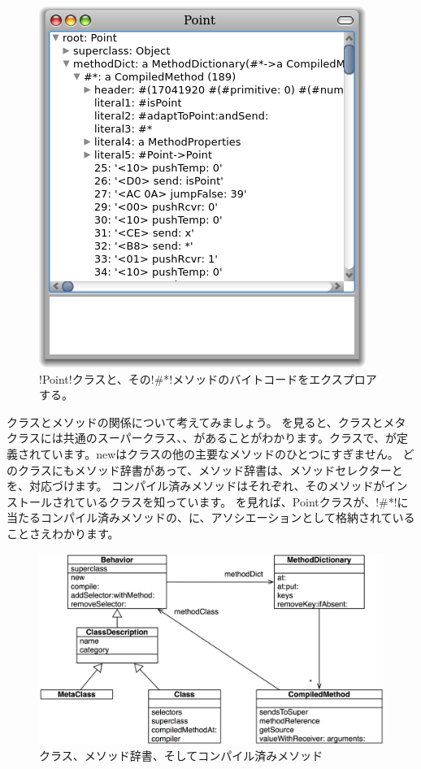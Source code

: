 \documentclass[a4paper,10pt,twoside]{book}
\begin{document}
\begin{figure}[ht]\centering
	\includegraphics[width=.5\linewidth]{CompiledMethod}
	\caption{\ct!Point!クラスと、その\ct!\#*!メソッドのバイトコードをエクスプロアする。} %
\end{figure}

クラスとメソッドの関係について考えてみましょう。
を見ると、クラスとメタクラスには共通のスーパークラス、、があることがわかります。クラスで、が定義されています。newはクラスの他の主要なメソッドのひとつにすぎません。 %
どのクラスにもメソッド辞書があって、メソッド辞書は、メソッドセレクターとを、対応づけます。
コンパイル済みメソッドはそれぞれ、そのメソッドがインストールされているクラスを知っています。
を見れば、Pointクラスが、\ct!\#*!に当たるコンパイル済みメソッドの、に、アソシエーションとして格納されていることさえわかります。

\begin{figure}[ht]\centering
	\includegraphics[width=\linewidth]{MethodsAsObjects}
	\caption{クラス、メソッド辞書、そしてコンパイル済みメソッド}
\end{figure}
\end{document}
